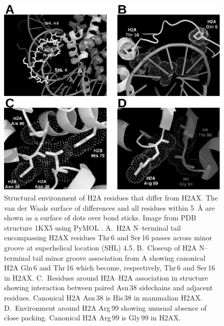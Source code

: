 \begin{figure}
\includegraphics{h2ax-review/figs/Fig5}
\caption{Structural environment of H2A residues that differ from H2AX\@. The van der Waals surface
of differences and all residues within \SI{5}{\angstrom} are shown as a surface of dots over bond sticks. Image
from PDB structure 1KX5 using PyMOL \protect\citep{DeL02}. A.~H2A N--terminal tail encompassing H2AX
residues Thr\,6 and Ser\,16 passes across minor groove at superhelical location (SHL) 4.5\@. B.~Closeup
of H2A N--terminal tail minor groove association from A showing canonical H2A Gln\,6 and Thr\,16 which
become, respectively, Thr\,6 and Ser\,16 in H2AX\@. C.~Residues around H2A--H2A association in structure
showing interaction between paired Asn\,38 sidechains and adjacent residues. Canonical H2A Asn\,38 is
His\,38 in mammalian H2AX\@. D.~Environment around H2A Arg\,99 showing unusual absence of close packing.
Canonical H2A Arg\,99 is Gly\,99 in H2AX.}
\label{fig:h2ax-review:framed}
\end{figure}

